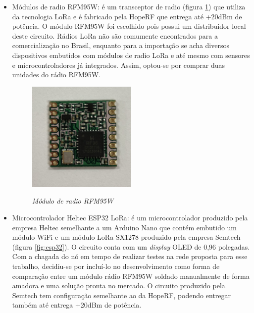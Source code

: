 \documentclass[
    hidelinks,
	12pt,				%
	openany,
	oneside, 
	a4paper,			%
	english,			%
	french,				%
	spanish,			%
	brazil				%
	]{abntex2}
\begin{document}
\begin{itemize}
\item Módulos de radio RFM95W: é um transceptor de radio (figura \ref{fig:rfm95w}) que utiliza da tecnologia LoRa e é fabricado pela HopeRF que entrega até +20dBm de potência. O módulo RFM95W foi escolhido pois possui um distribuidor local deste circuito. Rádios LoRa não são comumente encontrados para a comercialização no Brasil, enquanto para a importação se acha diversos dispositivos embutidos com módulos de radio LoRa e até mesmo com sensores e microcontroladores já integrados. Assim, optou-se por comprar duas unidades do rádio RFM95W.

\begin{figure}[ht]
    \centering
    \caption{\textit{Módulo de radio RFM95W}}
    \includegraphics[width=0.5\textwidth]{rfm95w.png}
    \label{fig:rfm95w}
\end{figure}

\item Microcontrolador Heltec ESP32 LoRa: é um microcontrolador produzido pela empresa Heltec semelhante a um Arduino Nano que contém embutido um módulo WiFi e um módulo LoRa SX1278 produzido pela empresa Semtech (figura \ref{fig:esp32}). O circuito conta com um \textit{display} OLED de 0,96 polegadas. Com a chagada do nó em tempo de realizar testes na rede proposta para esse trabalho, decidiu-se por incluí-lo no desenvolvimento como forma de comparação entre um módulo rádio RFM95W soldado manualmente de forma amadora e uma solução pronta no mercado. O circuito produzido pela Semtech tem configuração semelhante ao da HopeRF, podendo entregar também até entrega +20dBm de potência.


\end{itemize}
\end{document}

